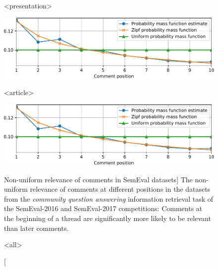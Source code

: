 \begin{figure}

\mode
<presentation>

\includegraphics{godwins-law}

\caption
  {Relevance of comments at different positions in the datasets
   from the CQA information retrieval task of the SemEval-2016 and
   2017 competitions: Comments at the beginning of
   a thread are significantly more likely to be relevant than later comments. -- \textcite[Figure 2]{novotny2018weighting}}

\mode
<article>

\includegraphics{godwins-law}
\vspace{-0.6cm}

\caption
  [Non-uniform relevance of comments in SemEval datasets]%
  {The non-uniform relevance of comments at different positions in the datasets
   from the \emph{community question answering} information retrieval task of
   the SemEval-2016 and SemEval-2017 competitions: Comments at the beginning of
   a thread are significantly more likely to be relevant than later comments.
   \cite[Figure 2]{novotny2018weighting}}

\mode
<all>

\label{fig:weighted-zone-scoring}
\end{figure}
